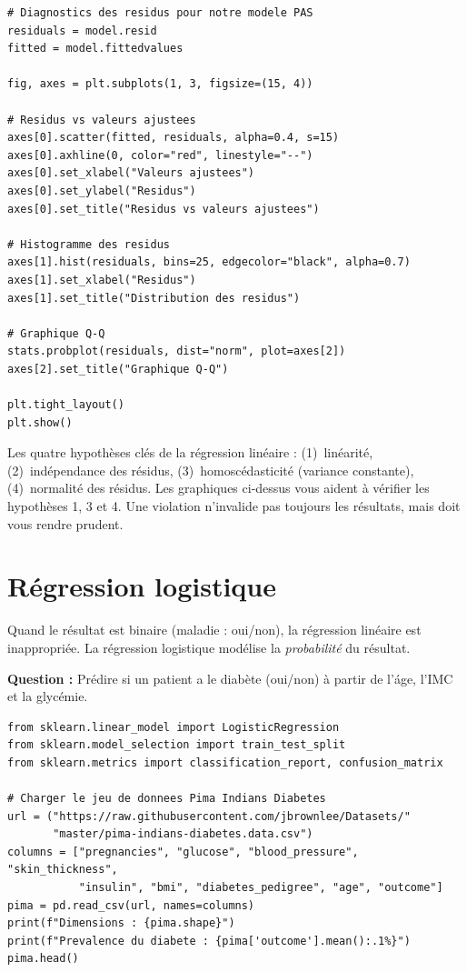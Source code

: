 \begin{verbatim}
# Diagnostics des residus pour notre modele PAS
residuals = model.resid
fitted = model.fittedvalues

fig, axes = plt.subplots(1, 3, figsize=(15, 4))

# Residus vs valeurs ajustees
axes[0].scatter(fitted, residuals, alpha=0.4, s=15)
axes[0].axhline(0, color="red", linestyle="--")
axes[0].set_xlabel("Valeurs ajustees")
axes[0].set_ylabel("Residus")
axes[0].set_title("Residus vs valeurs ajustees")

# Histogramme des residus
axes[1].hist(residuals, bins=25, edgecolor="black", alpha=0.7)
axes[1].set_xlabel("Residus")
axes[1].set_title("Distribution des residus")

# Graphique Q-Q
stats.probplot(residuals, dist="norm", plot=axes[2])
axes[2].set_title("Graphique Q-Q")

plt.tight_layout()
plt.show()
\end{verbatim}

\begin{clinicalnote}
Les quatre hypoth\`eses cl\'es de la r\'egression lin\'eaire : (1)~lin\'earit\'e, (2)~ind\'ependance des r\'esidus, (3)~homosc\'edasticit\'e (variance constante), (4)~normalit\'e des r\'esidus. Les graphiques ci-dessus vous aident \`a v\'erifier les hypoth\`eses 1, 3 et 4. Une violation n'invalide pas toujours les r\'esultats, mais doit vous rendre prudent.
\end{clinicalnote}

\section{R\'egression logistique}

Quand le r\'esultat est binaire (maladie : oui/non), la r\'egression lin\'eaire est inappropri\'ee. La r\'egression logistique mod\'elise la \emph{probabilit\'e} du r\'esultat.

\textbf{Question :} Pr\'edire si un patient a le diab\`ete (oui/non) \`a partir de l'\'age, l'IMC et la glyc\'emie.

\begin{verbatim}
from sklearn.linear_model import LogisticRegression
from sklearn.model_selection import train_test_split
from sklearn.metrics import classification_report, confusion_matrix

# Charger le jeu de donnees Pima Indians Diabetes
url = ("https://raw.githubusercontent.com/jbrownlee/Datasets/"
       "master/pima-indians-diabetes.data.csv")
columns = ["pregnancies", "glucose", "blood_pressure", "skin_thickness",
           "insulin", "bmi", "diabetes_pedigree", "age", "outcome"]
pima = pd.read_csv(url, names=columns)
print(f"Dimensions : {pima.shape}")
print(f"Prevalence du diabete : {pima['outcome'].mean():.1%}")
pima.head()
\end{verbatim}

